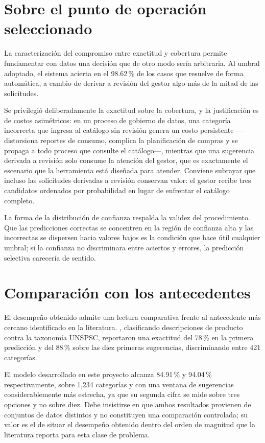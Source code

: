\section{Sobre el punto de operación seleccionado}
La caracterización del compromiso entre exactitud y cobertura permite fundamentar con datos una decisión que de otro modo sería arbitraria. Al umbral adoptado, el sistema acierta en el 98.62\,\% de los casos que resuelve de forma automática, a cambio de derivar a revisión del gestor algo más de la mitad de las solicitudes.

Se privilegió deliberadamente la exactitud sobre la cobertura, y la justificación es de costos asimétricos: en un proceso de gobierno de datos, una categoría incorrecta que ingresa al catálogo sin revisión genera un costo persistente —distorsiona reportes de consumo, complica la planificación de compras y se propaga a todo proceso que consulte el catálogo—, mientras que una sugerencia derivada a revisión solo consume la atención del gestor, que es exactamente el escenario que la herramienta está diseñada para atender. Conviene subrayar que incluso las solicitudes derivadas a revisión conservan valor: el gestor recibe tres candidatos ordenados por probabilidad en lugar de enfrentar el catálogo completo.

La forma de la distribución de confianza respalda la validez del procedimiento. Que las predicciones correctas se concentren en la región de confianza alta y las incorrectas se dispersen hacia valores bajos es la condición que hace útil cualquier umbral; si la confianza no discriminara entre aciertos y errores, la predicción selectiva carecería de sentido.

\section{Comparación con los antecedentes}
El desempeño obtenido admite una lectura comparativa frente al antecedente más cercano identificado en la literatura. , clasificando descripciones de producto contra la taxonomía UNSPSC, reportaron una exactitud del 78\,\% en la primera predicción y del 88\,\% sobre las diez primeras sugerencias, discriminando entre 421 categorías.

El modelo desarrollado en este proyecto alcanza 84.91\,\% y 94.04\,\% respectivamente, sobre 1,234 categorías y con una ventana de sugerencias considerablemente más estrecha, ya que su segunda cifra se mide sobre tres opciones y no sobre diez. Debe insistirse en que ambos resultados provienen de conjuntos de datos distintos y no constituyen una comparación controlada; su valor es el de situar el desempeño obtenido dentro del orden de magnitud que la literatura reporta para esta clase de problema.

